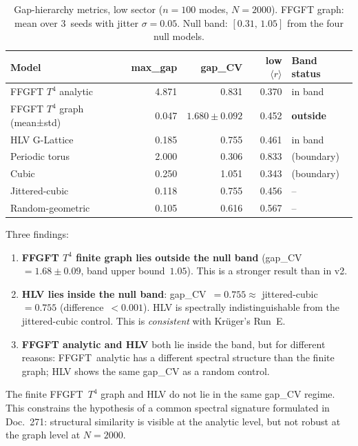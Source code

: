 \begin{table}[ht]
\centering
\caption{Gap-hierarchy metrics, low sector ($n=100$ modes, $N=2000$).
FFGFT graph: mean over 3~seeds with jitter $\sigma=0.05$.
Null band: $[0.31,\,1.05]$ from the four null models.}
\label{tab:gap275env3}
\begin{tabular}{@{}lrrrl@{}}
\toprule
Model & max\_gap & gap\_CV & low $\langle r\rangle$ & Band status \\
\midrule
FFGFT $T^4$ analytic       & 4.871 & 0.831 & 0.370 & in band \\
FFGFT $T^4$ graph (mean±std)& 0.047 & $1.680\pm0.092$ & 0.452 & \textbf{outside} \\
HLV G-Lattice              & 0.185 & 0.755 & 0.461 & in band \\
\midrule
Periodic torus             & 2.000 & 0.306 & 0.833 & (boundary) \\
Cubic                      & 0.250 & 1.051 & 0.343 & (boundary) \\
Jittered-cubic             & 0.118 & 0.755 & 0.456 & -- \\
Random-geometric           & 0.105 & 0.616 & 0.567 & -- \\
\bottomrule
\end{tabular}
\end{table}

Three findings:

\begin{enumerate}
  \item \textbf{FFGFT $T^4$ finite graph lies outside the null band}
        (gap\_CV~$= 1.68 \pm 0.09$, band upper bound~$1.05$).
        This is a stronger result than in v2.

  \item \textbf{HLV lies inside the null band}: gap\_CV~$= 0.755 \approx$
        jittered-cubic~$= 0.755$ (difference~$< 0.001$).
        HLV is spectrally indistinguishable from the jittered-cubic control.
        This is \emph{consistent} with Krüger's Run~E.

  \item \textbf{FFGFT analytic and HLV} both lie inside the band, but for
        different reasons: FFGFT~analytic has a different spectral structure
        than the finite graph; HLV shows the same gap\_CV as a random control.
\end{enumerate}

\begin{remark}
The finite FFGFT~$T^4$ graph and HLV do not lie in the same gap\_CV regime.
This constrains the hypothesis of a common spectral signature formulated in
Doc.~271: structural similarity is visible at the analytic level, but not
robust at the graph level at $N=2000$.
\end{remark}

